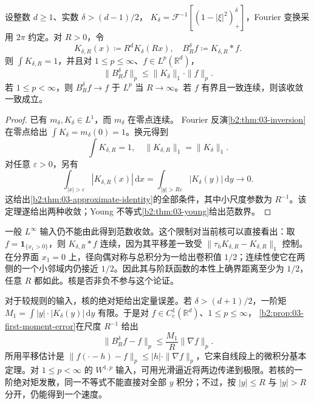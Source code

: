 \begin{proposition}[可积核的缩放逼近]\label{b2:prop:A2-approximate-identity}
设整数 \(d\geq1\)、实数 \(\delta>(d-1)/2\)，
\(K_\delta=\mathcal F^{-1}[(1-|\xi|^2)_+^\delta]\)，Fourier 变换采用 \(2\pi\) 约定。对 \(R>0\)，令
\[
 K_{\delta,R}(x)\coloneqq R^dK_\delta(Rx),\quad
 B_R^\delta f\coloneqq K_{\delta,R}*f.
\]
则 \(\int K_{\delta,R}=1\)，并且对 \(1\leq p\leq\infty\)、\(f\in L^p(\mathbb R^d)\)，
\[
 \|B_R^\delta f\|_p
 \leq\|K_\delta\|_1\cdot\|f\|_p.
\]
若 \(1\leq p<\infty\)，则 \(B_R^\delta f\to f\) 于 \(L^p\) 当 \(R\to\infty\)。若 \(f\) 有界且一致连续，则该收敛一致成立。
\end{proposition}
\begin{proof}
已有 \(m_\delta,K_\delta\in L^1\)，而 \(m_\delta\) 在零点连续。
Fourier 反演\cref{b2:thm:03-inversion}在零点给出
\(\int K_\delta=m_\delta(0)=1\)。换元得到
\[
 \int K_{\delta,R}=1,\quad
 \|K_{\delta,R}\|_1=\|K_\delta\|_1.
\]
对任意 \(\varepsilon>0\)，另有
\[
 \int_{|x|>\varepsilon}|K_{\delta,R}(x)|\,\mathrm dx
 =\int_{|y|>R\varepsilon}|K_\delta(y)|\,\mathrm dy
 \longrightarrow0.
\]
这给出\cref{b2:thm:03-approximate-identity}的全部条件，其中小尺度参数为 \(R^{-1}\)。该定理遂给出两种收敛；Young 不等式\cref{b2:thm:03-young}给出范数界。
\end{proof}

一般 \(L^\infty\) 输入仍不能由此得到范数收敛。这个限制对当前核可以直接看出：取
\(f=\mathbf1_{\{x_1>0\}}\)，则 \(K_{\delta,R}*f\) 连续，因为其平移差一致受
\(\|\tau_hK_{\delta,R}-K_{\delta,R}\|_1\) 控制。在分界面 \(x_1=0\) 上，径向偶对称与总积分为一给出卷积值 \(1/2\)；连续性使它在两侧的一个小邻域内仍接近 \(1/2\)。因此其与阶跃函数的本性上确界距离至少为 \(1/2\)，任意 \(R\) 都如此。核是否非负不参与这个论证。

\ProseParagraphBreak

对于较规则的输入，核的绝对矩给出定量误差。若
\(\delta>(d+1)/2\)，一阶矩
\(M_1=\int |y|\cdot|K_\delta(y)|\,\mathrm dy\) 有限。于是对
\(f\in C_c^1(\mathbb R^d)\)、\(1\leq p\leq\infty\)，
\cref{b2:prop:03-first-moment-error}在尺度 \(R^{-1}\) 给出
\[
 \|B_R^\delta f-f\|_p
 \leq\frac{M_1}{R}\|\nabla f\|_p.
\]
所用平移估计是
\(\|f(\cdot-h)-f\|_p\leq |h|\cdot\|\nabla f\|_p\)，它来自线段上的微积分基本定理。对 \(1\leq p<\infty\) 的 \(W^{1,p}\) 输入，可用光滑逼近将两边传递到极限。若核的一阶绝对矩发散，同一不等式不能直接对全部 \(y\) 积分；不过，按 \(|y|\leq R\) 与 \(|y|>R\) 分开，仍能得到一个速度。

